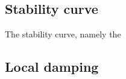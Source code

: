
\subsection{Stability curve}
\label{sub:dream_ls_ael_curve}

The stability curve, namely the 

\subsection{Local damping}
\label{sub:dream_ls_ael_local_damping}